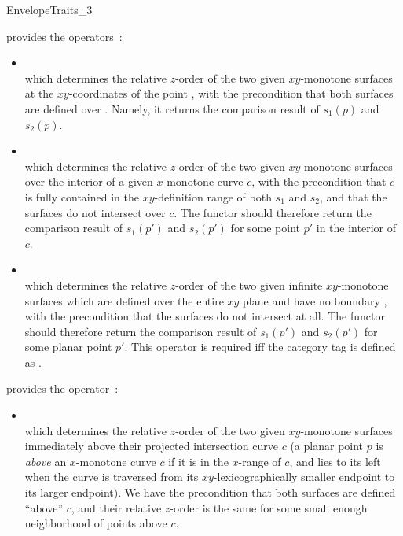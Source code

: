 \begin{ccRefConcept}{EnvelopeTraits_3}
{provides the operators~:
 \begin{itemize}
 \item {}\\
 which determines the relative $z$-order of the two given $xy$-monotone
 surfaces at the $xy$-coordinates of the point , with the
 precondition that both surfaces are defined over . Namely, it
 returns the comparison result of $s_1(p)$ and $s_2(p)$.
%
 \item {}\\
 which determines the relative $z$-order of the two given $xy$-monotone
 surfaces over the interior of a given $x$-monotone curve $c$, with the
 precondition that $c$ is fully contained in the $xy$-definition range
 of both $s_1$ and $s_2$, and that the surfaces do not intersect over
 $c$. The functor should therefore return the comparison result of
 $s_1(p')$ and $s_2(p')$ for some point $p'$ in the interior of $c$.
 \item {}\\
 which determines the relative $z$-order of the two given infinite $xy$-monotone
 surfaces which are defined over the entire $xy$ plane and have no boundary ,
 with the precondition that the surfaces do not intersect at all.
 The functor should therefore return the comparison result of
 $s_1(p')$ and $s_2(p')$ for some planar point $p'$.
 This operator is required iff the category tag  
 is defined as .
 
 \end{itemize}}

{provides the operator~:
 \begin{itemize}
 \item {}\\
 which determines the relative $z$-order of the two given $xy$-monotone
 surfaces immediately above their projected intersection curve
 $c$ (a planar point $p$ is {\em above} an $x$-monotone curve $c$ if it
 is in the $x$-range of $c$, and lies to its left when the curve is
 traversed from its $xy$-lexicographically smaller endpoint to its
 larger endpoint). We have the precondition that both surfaces are
 defined ``above'' $c$, and their relative $z$-order is the same for
 some small enough neighborhood of points above $c$.
 \end{itemize}}


\end{ccRefConcept}
